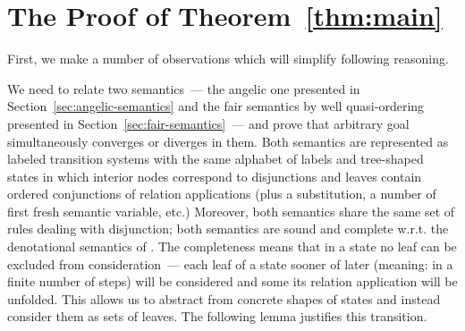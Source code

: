 \appendix

\section{The Proof of Theorem~\ref{thm:main}}
\label{sec:app}

First, we make a number of observations which will simplify following reasoning.

We need to relate two semantics~--- the angelic one presented in Section~\ref{sec:angelic-semantics} and
the fair semantics by well quasi-ordering presented in Section~\ref{sec:fair-semantics}~--- and prove that
arbitrary goal simultaneously converges or diverges in them. Both semantics are represented
as labeled transition systems with the same alphabet of labels and tree-shaped states in which interior
nodes correspond to disjunctions and leaves contain ordered conjunctions of relation applications (plus a
substitution, a number of first fresh semantic variable, etc.) Moreover, both semantics share the same
set of rules dealing with disjunction; both semantics are sound and complete w.r.t. the denotational
semantics of \mk. The completeness means that in a state no leaf can be excluded from consideration~---
each leaf of a state sooner of later (meaning: in a finite number of steps) will be considered and some
its relation application will be unfolded. This allows us to abstract from concrete shapes of states and
instead consider them as sets of leaves. The following lemma justifies this transition.

